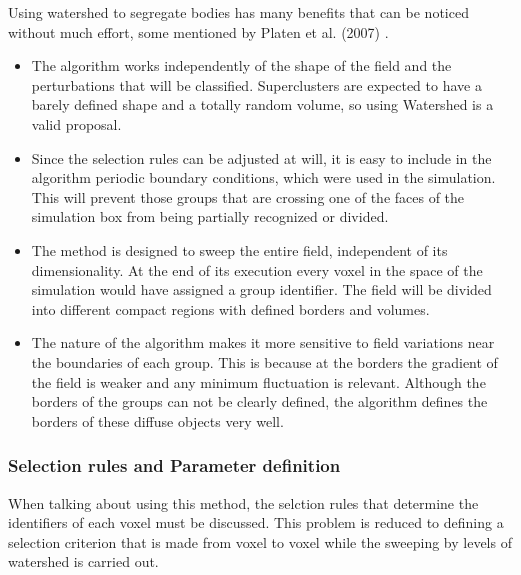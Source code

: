 Using watershed to segregate bodies has many benefits that can be noticed without much effort, some mentioned by Platen et al. (2007) \cite{CosmicWatershedVoidDetection}.
\begin{itemize}
\item The algorithm works independently of the shape of the field and the perturbations that will be classified. Superclusters are expected to have a barely defined shape and a totally random volume, so using Watershed is a valid proposal.
\item Since the selection rules can be adjusted at will, it is easy to include in the algorithm periodic boundary conditions, which were used in the simulation. This will prevent those groups that are crossing one of the faces of the simulation box from being partially recognized or divided.
\item The method is designed to sweep the entire field, independent of its dimensionality. At the end of its execution every voxel in the space of the simulation would have assigned a group identifier. The field will be divided into different compact regions with defined borders and volumes.
\item The nature of the algorithm makes it more sensitive to field variations near the boundaries of each group. This is because at the borders the gradient of the field is weaker and any minimum fluctuation is relevant. Although the borders of the groups can not be clearly defined, the algorithm defines the borders of these diffuse objects very well.
\end{itemize}

\subsubsection{Selection rules and Parameter definition}
When talking about using this method, the selction rules that determine the identifiers of each voxel must be discussed. This problem is reduced to defining a selection criterion that is made from voxel to voxel while the sweeping by levels of watershed is carried out. 

